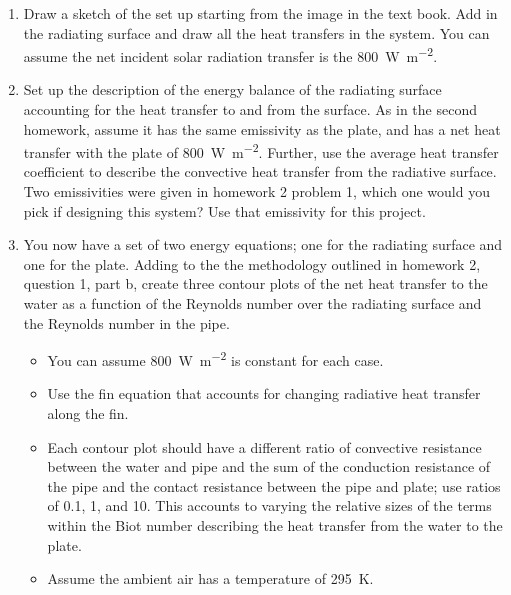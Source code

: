 \documentclass[12pt,letterpaper]{article}
\begin{document}
\begin{enumerate}
    \item Draw a sketch of the set up starting from the image in the text book.
        Add in the radiating surface and draw all the heat transfers in the system.
        You can assume the net incident solar radiation transfer is the \SI{800}{\watt\per\square\meter}.
    \item Set up the description of the energy balance of the radiating surface accounting for the heat transfer to and from the surface.
        As in the second homework, assume it has the same emissivity as the plate, and has a net heat transfer with the plate of \SI{800}{\watt\per\square\meter}.
        Further, use the average heat transfer coefficient to describe the convective heat transfer from the radiative surface.
        Two emissivities were given in homework 2 problem 1, which one would you pick if designing this system?
        Use that emissivity for this project.
    \item You now have a set of two energy equations; one for the radiating surface and one for the plate.
    	Adding to the the methodology outlined in homework 2, question 1, part b, create three contour plots of the net heat transfer to the water as a function of the Reynolds number over the radiating surface and the Reynolds number in the pipe.
	\begin{itemize}
            \item You can assume \SI{800}{\watt\per\square\meter} is constant for each case.
            \item Use the fin equation that accounts for changing radiative heat transfer along the fin.
            \item Each contour plot should have a different ratio of convective resistance between the water and pipe and the sum of the conduction resistance of the pipe and the contact resistance between the pipe and plate; use ratios of 0.1, 1, and 10.
                This accounts to varying the relative sizes of the terms within the Biot number describing the heat transfer from the water to the plate.
            \item Assume the ambient air has a temperature of \SI{295}{K}.
        \end{itemize}
\end{enumerate}
\end{document}
